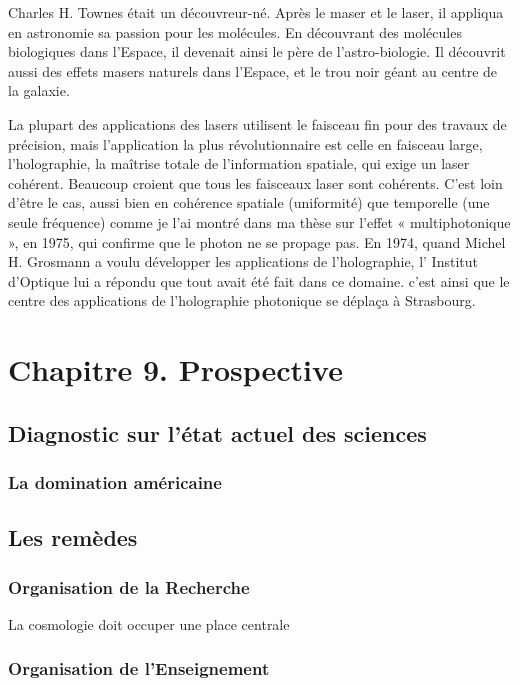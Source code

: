 \documentclass[a4paper,12pt]{article}
\begin{document}
Charles H. Townes était un découvreur-né. Après le maser et le laser, il appliqua en astronomie sa passion pour les molécules. En découvrant des molécules biologiques dans l'Espace, il devenait ainsi le père de l'astro-biologie. Il découvrit aussi des effets masers naturels dans l'Espace, et le trou noir géant au centre de la galaxie.    

La plupart des applications des lasers utilisent le faisceau fin pour des travaux de précision, mais l'application la plus révolutionnaire est celle en faisceau large, l'holographie, la maîtrise totale de l'information spatiale, qui exige un laser cohérent. Beaucoup croient que tous les faisceaux laser sont cohérents. C'est loin d'être le cas, aussi bien en cohérence spatiale (uniformité) que temporelle (une seule fréquence) comme je l'ai montré dans ma thèse sur l'effet « multiphotonique », en 1975, qui confirme que le photon ne se propage pas. En 1974, quand Michel H. Grosmann a voulu développer les applications de l'holographie, l' Institut d'Optique lui a répondu que tout avait été fait dans ce domaine. c'est ainsi que le centre des applications de l'holographie photonique se déplaça à Strasbourg.







\section{Chapitre 9. Prospective}

\subsection {Diagnostic sur l'état actuel des sciences}
\subsubsection{La domination américaine}



\subsection {Les remèdes} 
\subsubsection {Organisation de la Recherche}
La cosmologie doit occuper une place centrale
\subsubsection {Organisation de l'Enseignement}
\end{document}
